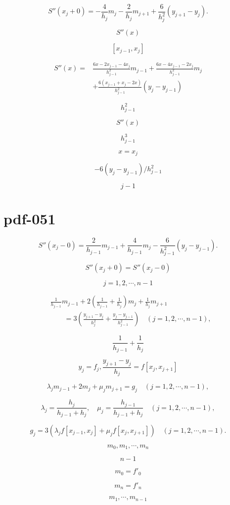 \documentclass[fontset=fandol]{ctexart}
\begin{document}
\[S''(x_j+0)=-\frac4{h_j}m_j-\frac2{h_j}m_{j+1}+\frac6{h_j^2}(y_{j+1}-y_j).\]

\[S''(x)\]

\[[x_{j-1},x_j]\]

\[\begin{aligned}
S''(x)={}&\frac{6x-2x_{j-1}-4x_j}{h_{j-1}^2}m_{j-1}+\frac{6x-4x_{j-1}-2x_j}{h_{j-1}^2}m_j\\
&+\frac{6(x_{j-1}+x_j-2x)}{h_{j-1}^2}(y_j-y_{j-1})
\end{aligned}\]

\[h_{j-1}^2\]

\[S''(x)\]

\[h_{j-1}^3\]

\[x=x_j\]

\[-6(y_j-y_{j-1})/h_{j-1}^2\]

\[j-1\]

\section*{pdf-051}

\[S''(x_j-0)=\frac2{h_{j-1}}m_{j-1}+\frac4{h_{j-1}}m_j-\frac6{h_{j-1}^2}(y_j-y_{j-1}).\]

\[S''(x_j+0)=S''(x_j-0)\]

\[j=1,2,\cdots,n-1\]

\[\begin{aligned}
&\frac1{h_{j-1}}m_{j-1}+2\left(\frac1{h_{j-1}}+\frac1{h_j}\right)m_j+\frac1{h_j}m_{j+1}\\
&\qquad=3\left(\frac{y_{j+1}-y_j}{h_j^2}+\frac{y_j-y_{j-1}}{h_{j-1}^2}\right)\quad(j=1,2,\cdots,n-1),
\end{aligned}\tag{2.8.8}\]

\[\frac1{h_{j-1}}+\frac1{h_j}\]

\[y_j=f_j,\frac{y_{j+1}-y_j}{h_j}=f[x_j,x_{j+1}]\]

\[\lambda_jm_{j-1}+2m_j+\mu_jm_{j+1}=g_j\quad(j=1,2,\cdots,n-1),\tag{2.8.9}\]

\[\lambda_j=\frac{h_j}{h_{j-1}+h_j},\quad\mu_j=\frac{h_{j-1}}{h_{j-1}+h_j}\quad(j=1,2,\cdots,n-1),\tag{2.8.10}\]

\[g_j=3(\lambda_jf[x_{j-1},x_j]+\mu_jf[x_j,x_{j+1}])\quad(j=1,2,\cdots,n-1).\tag{2.8.11}\]

\[m_0,m_1,\cdots,m_n\]

\[n-1\]

\[m_0=f'_0\]

\[m_n=f'_n\]

\[m_1,\cdots,m_{n-1}\]
\end{document}
